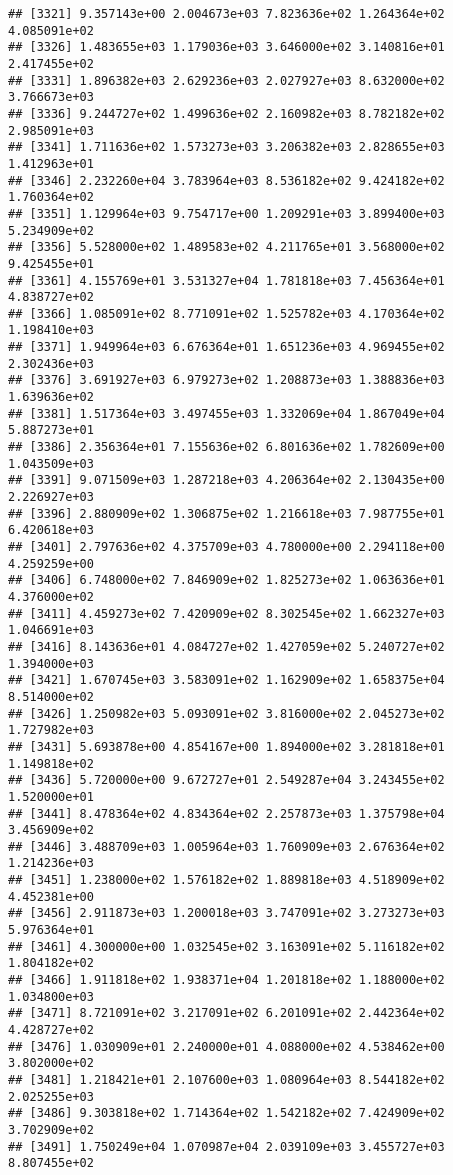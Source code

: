\documentclass[]{article}
\begin{document}
\begin{verbatim}
## [3321] 9.357143e+00 2.004673e+03 7.823636e+02 1.264364e+02 4.085091e+02
## [3326] 1.483655e+03 1.179036e+03 3.646000e+02 3.140816e+01 2.417455e+02
## [3331] 1.896382e+03 2.629236e+03 2.027927e+03 8.632000e+02 3.766673e+03
## [3336] 9.244727e+02 1.499636e+02 2.160982e+03 8.782182e+02 2.985091e+03
## [3341] 1.711636e+02 1.573273e+03 3.206382e+03 2.828655e+03 1.412963e+01
## [3346] 2.232260e+04 3.783964e+03 8.536182e+02 9.424182e+02 1.760364e+02
## [3351] 1.129964e+03 9.754717e+00 1.209291e+03 3.899400e+03 5.234909e+02
## [3356] 5.528000e+02 1.489583e+02 4.211765e+01 3.568000e+02 9.425455e+01
## [3361] 4.155769e+01 3.531327e+04 1.781818e+03 7.456364e+01 4.838727e+02
## [3366] 1.085091e+02 8.771091e+02 1.525782e+03 4.170364e+02 1.198410e+03
## [3371] 1.949964e+03 6.676364e+01 1.651236e+03 4.969455e+02 2.302436e+03
## [3376] 3.691927e+03 6.979273e+02 1.208873e+03 1.388836e+03 1.639636e+02
## [3381] 1.517364e+03 3.497455e+03 1.332069e+04 1.867049e+04 5.887273e+01
## [3386] 2.356364e+01 7.155636e+02 6.801636e+02 1.782609e+00 1.043509e+03
## [3391] 9.071509e+03 1.287218e+03 4.206364e+02 2.130435e+00 2.226927e+03
## [3396] 2.880909e+02 1.306875e+02 1.216618e+03 7.987755e+01 6.420618e+03
## [3401] 2.797636e+02 4.375709e+03 4.780000e+00 2.294118e+00 4.259259e+00
## [3406] 6.748000e+02 7.846909e+02 1.825273e+02 1.063636e+01 4.376000e+02
## [3411] 4.459273e+02 7.420909e+02 8.302545e+02 1.662327e+03 1.046691e+03
## [3416] 8.143636e+01 4.084727e+02 1.427059e+02 5.240727e+02 1.394000e+03
## [3421] 1.670745e+03 3.583091e+02 1.162909e+02 1.658375e+04 8.514000e+02
## [3426] 1.250982e+03 5.093091e+02 3.816000e+02 2.045273e+02 1.727982e+03
## [3431] 5.693878e+00 4.854167e+00 1.894000e+02 3.281818e+01 1.149818e+02
## [3436] 5.720000e+00 9.672727e+01 2.549287e+04 3.243455e+02 1.520000e+01
## [3441] 8.478364e+02 4.834364e+02 2.257873e+03 1.375798e+04 3.456909e+02
## [3446] 3.488709e+03 1.005964e+03 1.760909e+03 2.676364e+02 1.214236e+03
## [3451] 1.238000e+02 1.576182e+02 1.889818e+03 4.518909e+02 4.452381e+00
## [3456] 2.911873e+03 1.200018e+03 3.747091e+02 3.273273e+03 5.976364e+01
## [3461] 4.300000e+00 1.032545e+02 3.163091e+02 5.116182e+02 1.804182e+02
## [3466] 1.911818e+02 1.938371e+04 1.201818e+02 1.188000e+02 1.034800e+03
## [3471] 8.721091e+02 3.217091e+02 6.201091e+02 2.442364e+02 4.428727e+02
## [3476] 1.030909e+01 2.240000e+01 4.088000e+02 4.538462e+00 3.802000e+02
## [3481] 1.218421e+01 2.107600e+03 1.080964e+03 8.544182e+02 2.025255e+03
## [3486] 9.303818e+02 1.714364e+02 1.542182e+02 7.424909e+02 3.702909e+02
## [3491] 1.750249e+04 1.070987e+04 2.039109e+03 3.455727e+03 8.807455e+02

\end{verbatim}
\end{document}
